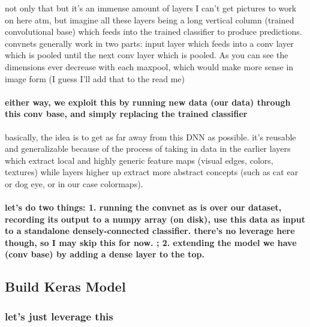 \documentclass[11pt]{article}
\begin{document}
not only that but it's an immense amount of layers I can't get pictures
to work on here atm, but imagine all these layers being a long vertical
column (trained convolutional base) which feeds into the trained
classifier to produce predictions. convnets generally work in two parts:
input layer which feeds into a conv layer which is pooled until the next
conv layer which is pooled. As you can see the dimensions ever decrease
with each maxpool, which would make more sense in image form (I guess
I'll add that to the read me)

\paragraph{either way, we exploit this by running new data (our data)
through this conv base, and simply replacing the trained
classifier}\label{either-way-we-exploit-this-by-running-new-data-our-data-through-this-conv-base-and-simply-replacing-the-trained-classifier}

basically, the idea is to get as far away from this DNN as possible.
it's reusable and generalizable because of the process of taking in data
in the earlier layers which extract local and highly generic feature
maps (visual edges, colors, textures) while layers higher up extract
more abstract concepts (such as cat ear or dog eye, or in our case
colormaps).

    \paragraph{let's do two things: 1. running the convnet as is over our
dataset, recording its output to a numpy array (on disk), use this data
as input to a standalone densely-connected classifier. there's no
leverage here though, so I may skip this for now. ; 2. extending the
model we have (conv base) by adding a dense layer to the
top.}\label{lets-do-two-things-1.-running-the-convnet-as-is-over-our-dataset-recording-its-output-to-a-numpy-array-on-disk-use-this-data-as-input-to-a-standalone-densely-connected-classifier.-theres-no-leverage-here-though-so-i-may-skip-this-for-now.-2.-extending-the-model-we-have-conv-base-by-adding-a-dense-layer-to-the-top.}

    \subsection{Build Keras Model}\label{build-keras-model}

\subsubsection{let's just leverage this}\label{lets-just-leverage-this}
\end{document}
